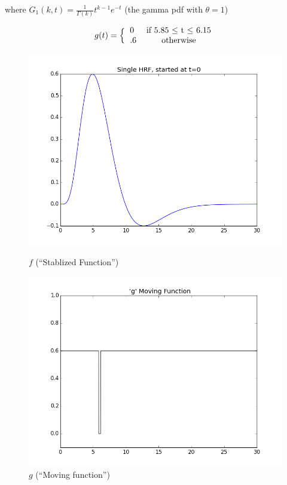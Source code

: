 \documentclass[11pt]{article}
\begin{document}
where $G_1(k,t) =\frac{1}{\Gamma(k)} t^{k-1} e^{-t}$ (the gamma pdf with $\theta =1$)

\begin{equation} \label{eq:step}
 g(t)=\Big \{ \begin{tabular}{l c}
 		0  & if  5.85 $\leq$ t $\leq$ 6.15\\
 		.6  & otherwise \\
 		\end{tabular} \end{equation}
 		
 		
\begin{figure}[ht]
\centering
\begin{minipage}[b]{0.45\linewidth}
	\centering
	\includegraphics[width=.8\linewidth]{images/hrf_pattern.png} 
	\caption{$f$ (``Stablized Function'')}
	\label{fig:f}
\end{minipage}	
\quad
\begin{minipage}[b]{0.45\linewidth}
	\centering
		\includegraphics[width=.8\linewidth]{images/play.png} 
	\caption{$g$ (``Moving function'')}
	\label{fig:g}
\end{minipage}
\end{figure}
\end{document}
